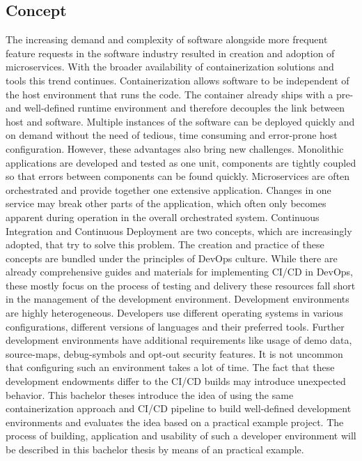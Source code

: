 \documentclass[12pt, a4paper]{article}
\begin{document}
\subsection{Concept}
The increasing demand and complexity of software alongside more frequent feature requests in the software industry resulted in creation and adoption of microservices. With the broader availability of containerization solutions and tools this trend continues. Containerization allows software to be independent of the host environment that runs the code. The container already ships with a pre- and well-defined runtime environment and therefore decouples the link between host and software. Multiple instances of the software can be deployed quickly and on demand without the need of tedious, time consuming and error-prone host configuration. However, these advantages also bring new challenges. Monolithic applications are developed and tested as one unit, components are tightly coupled so that errors between components can be found quickly. Microservices are often orchestrated and provide together one extensive application. Changes in one service may break other parts of the application, which often only becomes apparent during operation in the overall orchestrated system. Continuous Integration and Continuous Deployment are two concepts, which are increasingly adopted, that try to solve this problem. The creation and practice of these concepts are bundled under the principles of DevOps culture. While there are already comprehensive guides and materials for implementing CI/CD in DevOps, these mostly focus on the process of testing and delivery these resources fall short in the management of the development environment.\newline
Development environments are highly heterogeneous. Developers use different operating systems in various configurations, different versions of languages and their preferred tools. Further development environments have additional requirements like usage of demo data, source-maps, debug-symbols and opt-out security features. It is not uncommon that configuring such an environment takes a lot of time. The fact that these development endowments differ to the CI/CD builds may introduce unexpected behavior. This bachelor theses introduce the idea of using the same containerization approach and CI/CD pipeline to build well-defined development environments and evaluates the idea based on a practical example project.\newline
The process of building, application and usability of such a developer environment will be described in this bachelor thesis by means of an practical example.
\end{document}
